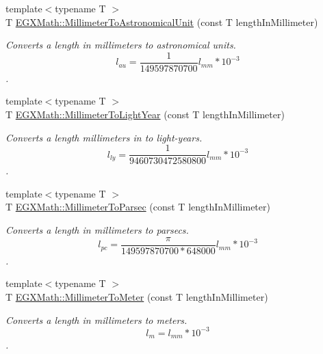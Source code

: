 \begin{DoxyCompactItemize}
\item 
{\footnotesize template$<$typename T $>$ }\\T \mbox{\hyperlink{group___e_g_x_math-_conversions-_length_conversions-_s_i-_millimeter-_astronomical_ga1ebdde429def9d2f19771a8847f9cfb5}{E\+G\+X\+Math\+::\+Millimeter\+To\+Astronomical\+Unit}} (const T length\+In\+Millimeter)
\begin{DoxyCompactList}\small\item\em Converts a length in millimeters to astronomical units. \[ l_{au}= \frac{1}{149597870700} l_{mm} * 10^{-3} \]. \end{DoxyCompactList}\item 
{\footnotesize template$<$typename T $>$ }\\T \mbox{\hyperlink{group___e_g_x_math-_conversions-_length_conversions-_s_i-_millimeter-_astronomical_gaca60b964c53d123506847dd98ba8a00b}{E\+G\+X\+Math\+::\+Millimeter\+To\+Light\+Year}} (const T length\+In\+Millimeter)
\begin{DoxyCompactList}\small\item\em Converts a length millimeters in to light-\/years. \[ l_{ly}= \frac{1}{9460730472580800} l_{mm} * 10^{-3} \]. \end{DoxyCompactList}\item 
{\footnotesize template$<$typename T $>$ }\\T \mbox{\hyperlink{group___e_g_x_math-_conversions-_length_conversions-_s_i-_millimeter-_astronomical_ga55cf82aa51af1d469ae58cc5d03570f7}{E\+G\+X\+Math\+::\+Millimeter\+To\+Parsec}} (const T length\+In\+Millimeter)
\begin{DoxyCompactList}\small\item\em Converts a length in millimeters to parsecs. \[ l_{pc}=\frac{\pi}{149597870700 * 648000} l_{mm} * 10^{-3} \]. \end{DoxyCompactList}\item 
{\footnotesize template$<$typename T $>$ }\\T \mbox{\hyperlink{group___e_g_x_math-_conversions-_length_conversions-_s_i-_millimeter-_s_i_ga5bf52177bcfa3cce836b7cec4dcf5fb5}{E\+G\+X\+Math\+::\+Millimeter\+To\+Meter}} (const T length\+In\+Millimeter)
\begin{DoxyCompactList}\small\item\em Converts a length in millimeters to meters. \[ l_{m}=l_{mm} * 10^{-3} \]. \end{DoxyCompactList}\item 

\end{DoxyCompactItemize}
